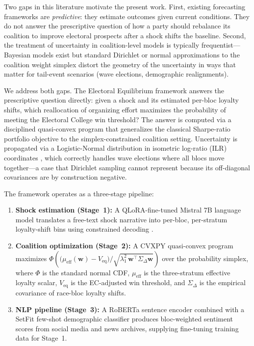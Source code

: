 \documentclass[12pt, letterpaper]{article}
\theoremstyle{definition}
\newcommand{\mueff}{\mu_{\mathrm{eff}}}
\newcommand{\Veq}{V_{\mathrm{eq}}}
\newcommand{\SigmaDelta}{\Sigma_{\Delta}}
\newcommand{\lambdaone}{\lambda_1}
\newcommand{\boldw}{\mathbf{w}}
\begin{document}
Two gaps in this literature motivate the present work. First, existing forecasting
frameworks are \textit{predictive}: they estimate outcomes given current conditions.
They do not answer the prescriptive question of how a party should rebalance its
coalition to improve electoral prospects after a shock shifts the baseline. Second,
the treatment of uncertainty in coalition-level models is typically frequentist---
Bayesian models exist but standard Dirichlet or normal approximations to the
coalition weight simplex distort the geometry of the uncertainty in ways that
matter for tail-event scenarios (wave elections, demographic realignments).

We address both gaps. The Electoral Equilibrium framework answers the prescriptive
question directly: given a shock and its estimated per-bloc loyalty shifts, which
reallocation of organizing effort maximizes the probability of meeting the Electoral
College win threshold? The answer is computed via a disciplined quasi-convex program
\citep{DiamondBoyd2019} that generalizes the classical Sharpe-ratio portfolio
objective to the simplex-constrained coalition setting. Uncertainty is propagated
via a Logistic-Normal distribution in isometric log-ratio (ILR) coordinates
\citep{Egozcue2003}, which correctly handles wave elections where all blocs move
together---a case that Dirichlet sampling cannot represent because its off-diagonal
covariances are by construction negative.

The framework operates as a three-stage pipeline:

\begin{enumerate}
  \item \textbf{Shock estimation (Stage~1):} A QLoRA-fine-tuned Mistral 7B language
        model \citep{Jiang2023, Hu2022} translates a free-text shock narrative
        into per-bloc, per-stratum loyalty-shift bins using constrained decoding
        \citep{Willard2023}.

  \item \textbf{Coalition optimization (Stage~2):} A CVXPY quasi-convex program
        maximizes $\Phi\!\left(\bigl(\mueff(\boldw) - \Veq\bigr) /
        \sqrt{\lambdaone^2\, \boldw^\top \SigmaDelta \boldw}\right)$
        over the probability simplex, where $\Phi$ is the standard normal CDF,
        $\mueff$ is the three-stratum effective loyalty scalar, $\Veq$ is the
        EC-adjusted win threshold, and $\SigmaDelta$ is the empirical covariance
        of race-bloc loyalty shifts.

  \item \textbf{NLP pipeline (Stage~3):} A RoBERTa sentence encoder \citep{Liu2019}
        combined with a SetFit few-shot demographic classifier \citep{Tunstall2022}
        produces bloc-weighted sentiment scores from social media and news archives,
        supplying fine-tuning training data for Stage~1.
\end{enumerate}
\end{document}
